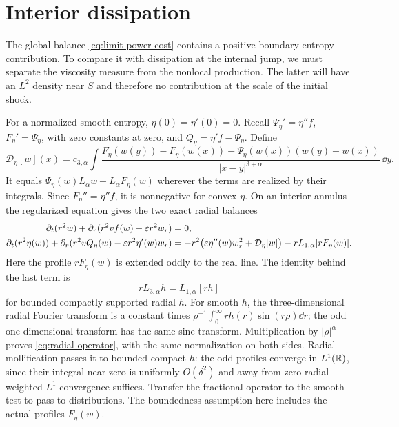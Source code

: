 \section{Interior dissipation}\label{sec:interaction}

The global balance \eqref{eq:limit-power-cost} contains a positive boundary
entropy contribution. To compare it with dissipation at the internal jump, we must separate
the viscosity measure from the nonlocal production. The latter will have
an $L^2$ density near $S$ and therefore no contribution at the scale of the
initial shock.

For a normalized smooth entropy, $\eta(0)=\eta'(0)=0$. Recall
$\Psi_\eta'=\eta''f$, $F_\eta'=\Psi_\eta$, with zero constants at zero,
and $Q_\eta=\eta'f-\Psi_\eta$. Define
\begin{equation}\label{eq:defect}
 \mathcal D_\eta[w](x)=c_{3,\alpha}\int
 \frac{F_\eta(w(y))-F_\eta(w(x))
 -\Psi_\eta(w(x))(w(y)-w(x))}{|x-y|^{3+\alpha}}\,\dd y.
\end{equation}
It equals $\Psi_\eta(w)L_\alpha w-L_\alpha F_\eta(w)$ wherever the
terms are realized by their integrals. Since $F_\eta''=\eta''f$, it is
nonnegative for convex $\eta$. On an interior annulus the regularized
equation gives the two exact radial balances
\begin{align}
 \partial_t(r^2w)+\partial_r(r^2v f(w)-\varepsilon r^2w_r)&=0,
                                                        \label{eq:radial-mass}\\
 \partial_t(r^2\eta(w))+
 \partial_r(r^2v Q_\eta(w)-\varepsilon r^2\eta'(w)w_r)
 &=-r^2\bigl(\varepsilon\eta''(w)w_r^2+\mathcal D_\eta[w]\bigr)
       -rL_{1,\alpha}[rF_\eta(w)].\label{eq:radial-entropy}
\end{align}
Here the profile $rF_\eta(w)$ is extended oddly to the real line.
The identity behind the last term is
\begin{equation}\label{eq:radial-operator}
 rL_{3,\alpha}h=L_{1,\alpha}[rh]
\end{equation}
for bounded compactly supported radial $h$. For smooth $h$, the
three-dimensional radial Fourier transform is a constant times
$\rho^{-1}\int_0^\infty rh(r)\sin(r\rho)\dd r$; the odd
one-dimensional transform has the same sine transform. Multiplication
by $|\rho|^\alpha$ proves \eqref{eq:radial-operator}, with the same
normalization on both sides. Radial mollification passes it to bounded
compact $h$: the odd profiles converge in $L^1(\mathbb R)$, since their integral
near zero is uniformly $O(\delta^2)$ and away from zero radial weighted
$L^1$ convergence suffices. Transfer the fractional operator to the smooth
test to pass to distributions. The boundedness assumption here includes
the actual profiles $F_\eta(w)$.

